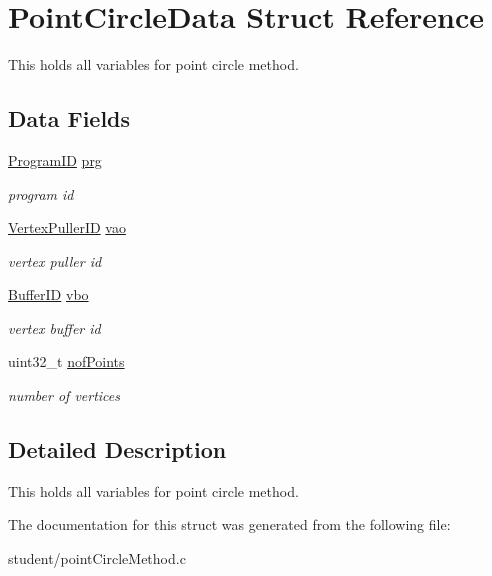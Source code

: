 \hypertarget{structPointCircleData}{}\section{Point\+Circle\+Data Struct Reference}
\label{structPointCircleData}


This holds all variables for point circle method.  


\subsection*{Data Fields}
\begin{DoxyCompactItemize}
\item 
\mbox{\label{structPointCircleData_a91256a054d456b6c3f661d1fc90c2038}} 
\hyperlink{student_2fwd_8h_a15e62786033208aec9487a51e808f81d}{Program\+ID} \hyperlink{structPointCircleData_a91256a054d456b6c3f661d1fc90c2038}{prg}
\begin{DoxyCompactList}\small\item\em program id \end{DoxyCompactList}\item 
\mbox{\label{structPointCircleData_a972957b689ca6f63b55ff834ad285268}} 
\hyperlink{student_2fwd_8h_a23828e2281a794e193ebaf0df3e1f17c}{Vertex\+Puller\+ID} \hyperlink{structPointCircleData_a972957b689ca6f63b55ff834ad285268}{vao}
\begin{DoxyCompactList}\small\item\em vertex puller id \end{DoxyCompactList}\item 
\mbox{\label{structPointCircleData_afbbf17a8e0c1d84fb9ddc1f4fb7ae704}} 
\hyperlink{student_2fwd_8h_a60a12bf4868ebe47cc571ce96a03f99c}{Buffer\+ID} \hyperlink{structPointCircleData_afbbf17a8e0c1d84fb9ddc1f4fb7ae704}{vbo}
\begin{DoxyCompactList}\small\item\em vertex buffer id \end{DoxyCompactList}\item 
\mbox{\label{structPointCircleData_a7abecef6dbc69a26cc54066632bee9f0}} 
uint32\+\_\+t \hyperlink{structPointCircleData_a7abecef6dbc69a26cc54066632bee9f0}{nof\+Points}
\begin{DoxyCompactList}\small\item\em number of vertices \end{DoxyCompactList}\end{DoxyCompactItemize}


\subsection{Detailed Description}
This holds all variables for point circle method. 

The documentation for this struct was generated from the following file\+:\begin{DoxyCompactItemize}
\item 
student/point\+Circle\+Method.\+c\end{DoxyCompactItemize}

